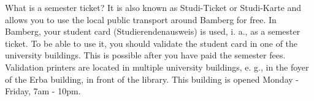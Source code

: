 
What is a semester ticket?
It is also known as Studi-Ticket or Studi-Karte and allows you to use the local public transport around Bamberg for free.
In Bamberg, your student card (Studierendenausweis) is used, i. a., as a semester ticket.
To be able to use it, you should validate the student card in one of the university buildings.
This is possible after you have paid the semester fees.
Validation printers are located in multiple university buildings, e. g., in the foyer of the Erba building, in front of the library.
This building is opened Monday - Friday, 7am - 10pm. 
